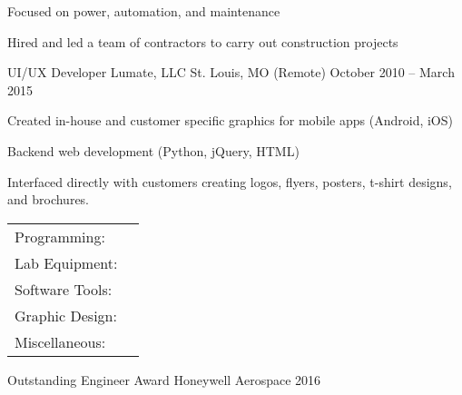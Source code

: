 \documentclass[]{awesome-cv}
\begin{document}
\begin{cventries}
{\begin{cvitems}
		\item {Focused on power, automation, and maintenance}
		\item {Hired and led a team of contractors to carry out construction projects}
		\end{cvitems}}
	\cventry
	{UI/UX Developer}
	{Lumate, LLC}
	{St. Louis, MO (Remote)}
	{October 2010 – March 2015}
	{\begin{cvitems}
		\item {Created in-house and customer specific graphics for mobile apps (Android, iOS)}
		\item {Backend web development (Python, jQuery, HTML)}
		\item {Interfaced directly with customers creating logos, flyers, posters, t-shirt designs, and brochures.}
		\end{cvitems}}
\end{cventries}
\begin{cventries}
	\cventry
	{}
	{\def\arraystretch{1.15}{\begin{tabular}{ l l }
		Programming:  & {\skill{ VB.NET, Python, Java, MATLAB, Powershell, Github, Subversion, TestStand, ADB, VISA}} \\
		Lab Equipment:  & {\skill{ Oscilloscopes, DMM, VNA, power supplies, multi-meters, Raspberry Pi, Arduino, PXI}} \\
		Software Tools:  & {\skill{ Schematic capture, PCB layout, Mentor Graphics, CADSTAR, OrCad, SPICE, Solidworks}} \\
		Graphic Design:  & {\skill{ Photoshop, Illustrator, LaTeX}} \\
		Miscellaneous:  & {\skill{ MS Office, MS Project, Excel, Android, Linux, Windows, Jira}} \\
		\end{tabular}}}
	{}
	{}
	{}
\end{cventries}

\vspace{-7mm}

\begin{cvhonors}
	\cvhonor
	{Outstanding Engineer Award}
	{Honeywell Aerospace }
	{}
	{2016}
\end{cvhonors}
\ 
\end{document}
